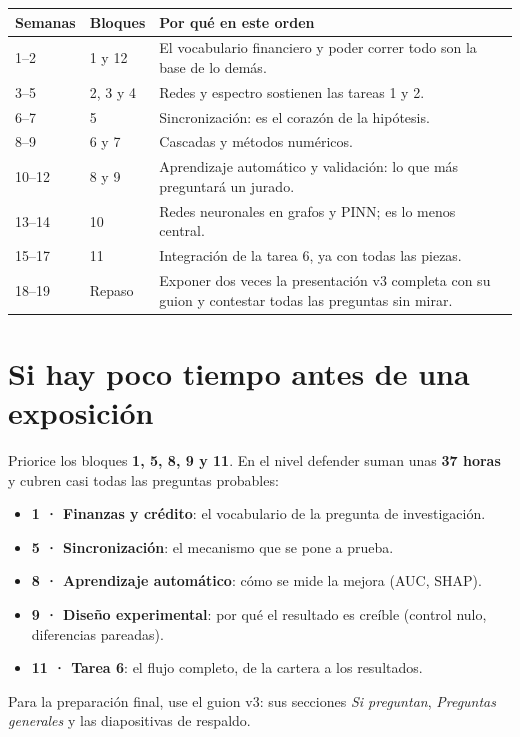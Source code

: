 \documentclass[11pt,a4paper,oneside]{article}
\begin{document}
\begin{center}
\begin{tabular}{lp{}p{}}
\toprule
\textbf{Semanas} & \textbf{Bloques} & \textbf{Por qué en este orden} \\
\midrule
1–2 & 1 y 12 & El vocabulario financiero y poder correr todo son la base de lo demás. \\
3–5 & 2, 3 y 4 & Redes y espectro sostienen las tareas 1 y 2. \\
6–7 & 5 & Sincronización: es el corazón de la hipótesis. \\
8–9 & 6 y 7 & Cascadas y métodos numéricos. \\
10–12 & 8 y 9 & Aprendizaje automático y validación: lo que más preguntará un jurado. \\
13–14 & 10 & Redes neuronales en grafos y PINN; es lo menos central. \\
15–17 & 11 & Integración de la tarea 6, ya con todas las piezas. \\
18–19 & Repaso & Exponer dos veces la presentación v3 completa con su guion y contestar
todas las preguntas sin mirar. \\
\bottomrule
\end{tabular}
\end{center}

\section{Si hay poco tiempo antes de una exposición}

Priorice los bloques \textbf{1, 5, 8, 9 y 11}. En el nivel defender suman unas
\textbf{37 horas} y cubren casi todas las preguntas probables:

\begin{itemize}
\item \textbf{1 · Finanzas y crédito}: el vocabulario de la pregunta de investigación.
\item \textbf{5 · Sincronización}: el mecanismo que se pone a prueba.
\item \textbf{8 · Aprendizaje automático}: cómo se mide la mejora (AUC, SHAP).
\item \textbf{9 · Diseño experimental}: por qué el resultado es creíble (control nulo,
diferencias pareadas).
\item \textbf{11 · Tarea 6}: el flujo completo, de la cartera a los resultados.
\end{itemize}

Para la preparación final, use el guion v3: sus secciones \emph{Si preguntan},
\emph{Preguntas generales} y las diapositivas de respaldo.
\end{document}

